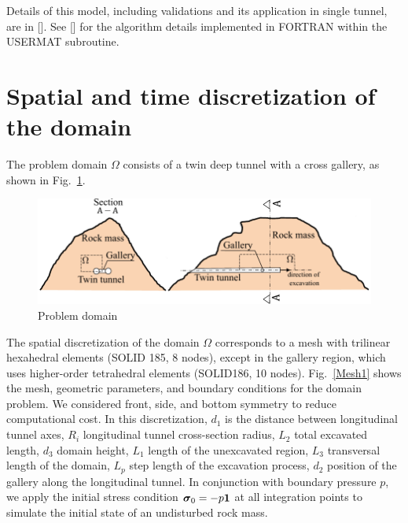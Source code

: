 \documentclass[a4paper,fleqn]{cas-sc}
\begin{document}
Details of this model, including validations and its application in single tunnel, are in []. See [] for the algorithm details implemented in FORTRAN within the USERMAT subroutine.


\section{Spatial and time discretization of the domain}\label{}

The problem domain $\Omega$ consists of a twin deep tunnel with a cross gallery, as shown in Fig.~\ref{domain}.
\begin{figure}[h!]
	\centering
	\includegraphics[scale=1]{Domain.pdf}
	\caption{Problem domain}
	\label{domain}
\end{figure}
\FloatBarrier
The spatial discretization of the domain $\Omega$ corresponds to a mesh with trilinear hexahedral elements (SOLID 185, 8 nodes), except in the gallery region, which uses higher-order tetrahedral elements (SOLID186, 10 nodes). Fig.~\ref{Mesh1} shows the mesh, geometric parameters, and boundary conditions for the domain problem. We considered front, side, and bottom symmetry to reduce computational cost. In this discretization, $d_1$ is the distance between longitudinal tunnel axes, $R_i$ longitudinal tunnel cross-section radius, $L_2$ total excavated length, $d_3$ domain height, $L_1$ length of the unexcavated region, $L_3$ transversal length of the domain, $L_p$ step length of the excavation process, $d_2$ position of the gallery along the longitudinal tunnel. In conjunction with boundary pressure $p$, we apply the initial stress condition $\boldsymbol{\sigma}_0 = -p\boldsymbol{1}$ at all integration points to simulate the initial state of an undisturbed rock mass. 
\end{document}
